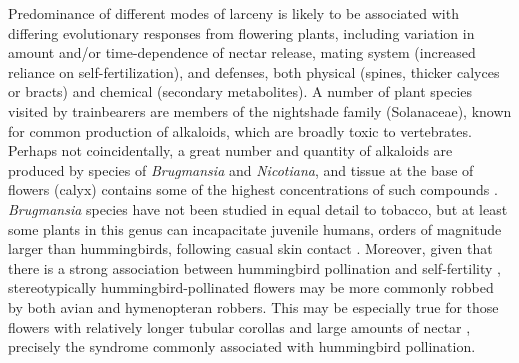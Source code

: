 \documentclass[fleqn,10pt,lineno]{wlpeerj}
\begin{document}
%
%

Predominance of different modes of larceny is likely to be associated with differing evolutionary responses from flowering plants, including variation in amount and/or time-dependence of nectar release, mating system (increased reliance on self-fertilization), and defenses, both physical (spines, thicker calyces or bracts) and chemical (secondary metabolites). 
A number of plant species visited by trainbearers are members of the nightshade family (Solanaceae), known for common production of alkaloids, which are broadly toxic to vertebrates. 
Perhaps not coincidentally, a great number and quantity of alkaloids are produced by species of \textit{Brugmansia} and \textit{Nicotiana}, and tissue at the base of flowers (calyx) contains some of the highest concentrations of such compounds \citep{saitoh1985, alves2007}. 
\textit{Brugmansia} species have not been studied in equal detail to tobacco, but at least some plants in this genus can incapacitate juvenile humans, orders of magnitude larger than hummingbirds, following casual skin contact \citep{andreola2008}. 
Moreover, given that there is a strong association between hummingbird pollination and self-fertility \citep{wolowski2013}, stereotypically hummingbird-pollinated flowers may be more commonly robbed by both avian and hymenopteran robbers. 
This may be especially true for those flowers with relatively longer tubular corollas and large amounts of nectar \citep{lara2001,rojas-nossa2016}, precisely the syndrome commonly associated with hummingbird pollination.

%
%

%
%
%


%
%
\end{document}
